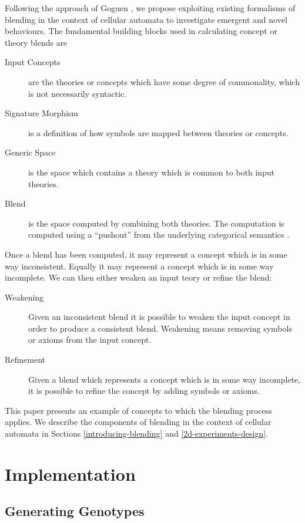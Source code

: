 \documentclass{AISB2008}
\begin{document}
Following the approach of Goguen \cite{}, we propose exploiting
existing formalisms of blending in the context of cellular automata to
investigate emergent and novel behaviours. The fundamental building blocks used in calculating concept or theory blends are
\begin{description}
\item[Input Concepts] are the theories or concepts which have some degree of commonality, which is not necessarily syntactic. 
\item[Signature Morphism] is a definition of how symbols are mapped between theories or concepts. 
\item[Generic Space] is the space which contains a theory which is common to both input theories.
\item[Blend] is the space computed by combining both theories. The computation is computed using a ``pushout'' from the underlying categorical semantics \cite{}. 
\end{description}

Once a blend has been computed, it may represent a concept which is in some way inconsistent. Equally it may represent a concept which is in some way incomplete. We can then either weaken an input teory or refine the blend:
\begin{description}
\item[Weakening] Given an inconsistent blend it is possible to weaken the input concept in order to produce a consistent blend. Weakening means removing symbols or axioms from the input concept.
\item[Refinement] Given a blend which represents a concept which is in some way incomplete, it is possible to refine the concept by adding symbols or axioms.
\end{description}

This paper presents an example of concepts to which the blending
process applies.  We describe the components of blending in the
context of cellular automata in Sections \ref{introducing-blending}
and \ref{2d-experiments-design}.

\clearpage

\section{Implementation}


\subsection{Generating Genotypes}
\end{document}
